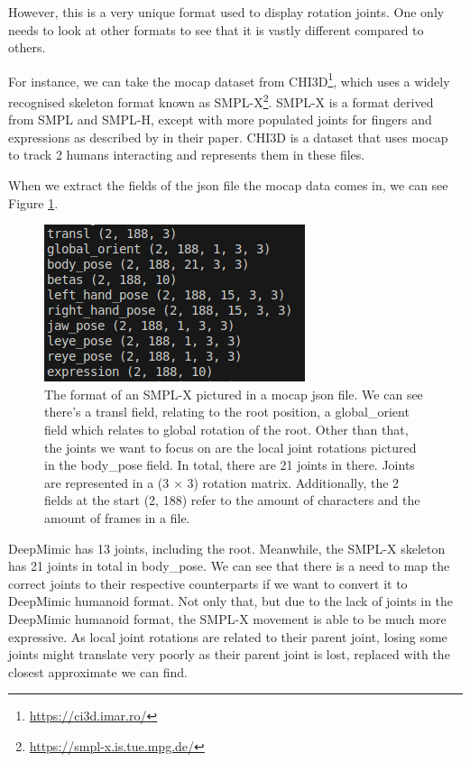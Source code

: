 \documentclass{l4proj}
\begin{document}
However, this is a very unique format used to display rotation joints. One only needs to look at other formats to see that it is vastly different compared to others.

For instance, we can take the mocap dataset from CHI3D\footnote{\url{https://ci3d.imar.ro/}}, which uses a widely recognised skeleton format known as SMPL-X\footnote{\url{https://smpl-x.is.tue.mpg.de/}}. SMPL-X is a format derived from SMPL and SMPL-H, except with more populated joints for fingers and expressions as described by \cite{smplx19} in their paper. CHI3D is a dataset that uses mocap to track 2 humans interacting and represents them in these files.

When we extract the fields of the json file the mocap data comes in, we can see Figure \ref{fig:smplx_format}.

\begin{figure}[htb]
  \centering
  \includegraphics[width = 0.5\linewidth]{images/smplx_format.png}

  \caption{The format of an SMPL-X pictured in a mocap json file. We can see there's a transl field, relating to the root position, a global\_orient field which relates to global rotation of the root. Other than that, the joints we want to focus on are the local joint rotations pictured in the body\_pose field. In total, there are 21 joints in there. Joints are represented in a (3 $\times$ 3) rotation matrix. Additionally, the 2 fields at the start (2, 188) refer to the amount of characters and the amount of frames in a file.}

  \label{fig:smplx_format}
\end{figure}

DeepMimic has 13 joints, including the root. Meanwhile, the SMPL-X skeleton has 21 joints in total in body\_pose. We can see that there is a need to map the correct joints to their respective counterparts if we want to convert it to DeepMimic humanoid format. Not only that, but due to the lack of joints in the DeepMimic humanoid format, the SMPL-X movement is able to be much more expressive. As local joint rotations are related to their parent joint, losing some joints might translate very poorly as their parent joint is lost, replaced with the closest approximate we can find.
\end{document}
